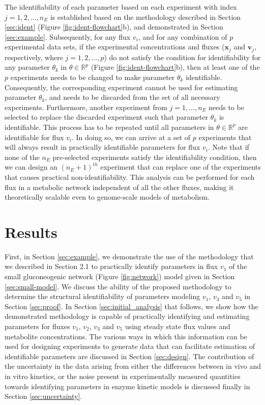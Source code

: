 \documentclass[10pt]{article}
\begin{document}
	The identifiability of each parameter based on each experiment with index $j = {1, 2, ..., n_E}$ is established based on the methodology described in Section \ref{sec:ident} (Figure \ref{fig:ident-flowchart}b), and demonstrated in Section \ref{sec:example}. Subsequently, for any flux $v_i$, and for any combination of $p$ experimental data sets, if the experimental concentrations and fluxes ($\mathbf{x}_j$ and $\mathbf{v}_j$, respectively, where $j = {1, 2,..., p}$) do not satisfy the condition for identifiability for any parameter $\theta_k$ in $\theta\in\mathbb{R}^p$ (Figure \ref{fig:ident-flowchart}b), then at least one of the $p$ experiments needs to be changed to make parameter $\theta_k$ identifiable. Consequently, the corresponding experiment cannot be used for estimating parameter $\theta_k$, and needs to be discarded from the set of all necessary experiments. Furthermore, another experiment from $j = {1, ..., n_E}$ needs to be selected to replace the discarded experiment such that parameter $\theta_k$ is identifiable. This process has to be repeated until all parameters in $\theta\in\mathbb{R}^p$ are identifiable for flux $v_i$. In doing so, we can arrive at a set of $p$ experiments that will always result in practically identifiable parameters for flux $v_i$. Note that if none of the $n_E$ pre-selected experiments satisfy the identifiability condition, then we can design an $(n_E+1)^{th}$ experiment that can replace one of the experiments that causes practical non-identifiability. This analysis can be performed for each flux in a metabolic network independent of all the other fluxes, making it theoretically scalable even to genome-scale models of metabolism. 	
	
	\section{Results}
	First, in Section \ref{sec:example}, we demonstrate the use of the methodology that we described in Section 2.1 to practically identify parameters in flux $v_1$ of the small gluconeogenic network (Figure \ref{fig:network}) model given in Section \ref{sec:small-model}. 
	We discuss the ability of the proposed methodology to determine the structural identifiability of parameters modeling $v_1$, $v_3$ and $v_5$ in Section \ref{sec:proof}. 	
	In Section \ref{sec:initial_analysis} that follows, we show how the demonstrated methodology is capable of practically identifying and estimating parameters for fluxes $v_1$, $v_2$, $v_3$ and $v_5$ using steady state flux values and metabolite concentrations. 
	The various ways in which this information can be used for designing experiments to generate data that can facilitate estimation of identifiable parameters are discussed in Section \ref{sec:design}.
	The contribution of the uncertainty in the data arising from either the differences between in vivo and in vitro kinetics, or the noise present in experimentally measured quantities towards identifying parameters in enzyme kinetic models is discussed finally in Section \ref{sec:uncertainty}.
		
\end{document}
